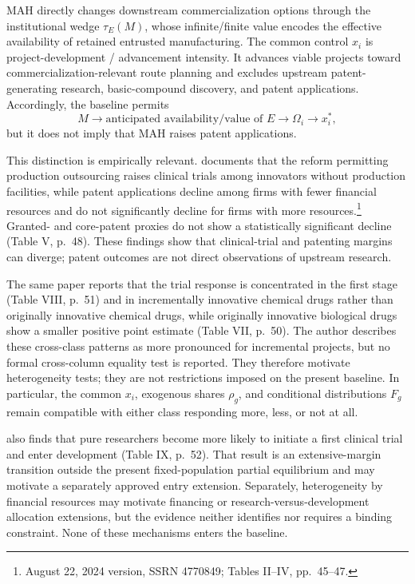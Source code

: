 \documentclass[11pt]{article}
\newcommand{\1}{\mathbf{1}}
\begin{document}
MAH directly changes downstream commercialization options through the
institutional wedge \(\tau_E(M)\), whose infinite/finite value encodes the
effective availability of retained entrusted manufacturing. The common control \(x_i\) is project-development / advancement intensity. It advances viable projects
toward commercialization-relevant route planning and excludes upstream patent-generating research, basic-compound
discovery, and patent applications. Accordingly, the baseline permits
\[
  M
  \longrightarrow
  \text{anticipated availability/value of }E
  \longrightarrow
  \Omega_i
  \longrightarrow
  x_i^*,
\]
but it does not imply that MAH raises patent applications.

This distinction is empirically relevant. \citet{Gu2024} documents that the
reform permitting production outsourcing raises clinical trials among
innovators without production facilities, while patent applications decline
among firms with fewer financial resources and do not significantly decline
for firms with more resources.\footnote{August 22, 2024 version, SSRN 4770849; Tables II--IV, pp.~45--47.}
Granted- and core-patent proxies do not show a statistically significant
decline (Table V, p.~48). These findings show that clinical-trial and patenting
margins can diverge; patent outcomes are not direct observations of upstream
research.

The same paper reports that the trial response is concentrated in the first
stage (Table VIII, p.~51) and in incrementally innovative chemical drugs
rather than originally innovative chemical drugs, while originally
innovative biological drugs show a smaller positive point estimate
(Table VII, p.~50). The author describes these cross-class patterns as more
pronounced for incremental projects, but no formal cross-column equality test
is reported. They therefore motivate heterogeneity tests; they are not
restrictions imposed on the present baseline. In particular, the common
\(x_i\), exogenous shares \(\rho_g\), and conditional distributions \(F_g\)
remain compatible with either class responding more, less, or not at all.

\citet{Gu2024} also finds that pure researchers become more likely to initiate a
first clinical trial and enter development (Table IX, p.~52). That result is
an extensive-margin transition outside the present fixed-population partial
equilibrium and may motivate a separately approved entry extension.
Separately, heterogeneity by financial resources may motivate financing or
research-versus-development allocation extensions, but the evidence neither
identifies nor requires a binding constraint. None of these mechanisms enters
the baseline.




\clearpage


\end{document}
